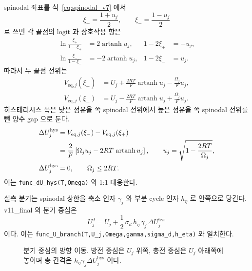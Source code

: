 \documentclass[11pt,a4paper]{article}
\newcommand{\eq}{\mathrm{eq}}
\newcommand{\hys}{\mathrm{hys}}
\begin{document}
spinodal 좌표를 식~\eqref{eq:spinodal_v7} 에서
\begin{equation}
\xi_+=\frac{1+u_j}{2},\qquad
\xi_-=\frac{1-u_j}{2}
\label{eq:spinodalpm}
\end{equation}
로 쓰면 각 끝점의 logit 과 상호작용 항은
\begin{align}
\ln\frac{\xi_+}{1-\xi_+}&=2\operatorname{artanh}u_j,
&
1-2\xi_+&=-u_j,\label{eq:spinodalplus}\\
\ln\frac{\xi_-}{1-\xi_-}&=-2\operatorname{artanh}u_j,
&
1-2\xi_-&=u_j.\label{eq:spinodalminus}
\end{align}
따라서 두 끝점 전위는
\begin{align}
V_{\eq,j}(\xi_+)
&=U_j+\frac{2RT}{F}\operatorname{artanh}u_j-\frac{\Omega_j}{F}u_j,\label{eq:Vspinplus}\\
V_{\eq,j}(\xi_-)
&=U_j-\frac{2RT}{F}\operatorname{artanh}u_j+\frac{\Omega_j}{F}u_j.\label{eq:Vspinminus}
\end{align}
히스테리시스 폭은 낮은 점유율 쪽 spinodal 전위에서 높은 점유율 쪽 spinodal 전위를 뺀 양수 gap 으로 둔다.
\begin{align}
\Delta U_j^\hys
&=V_{\eq,j}(\xi_-)-V_{\eq,j}(\xi_+)\notag\\
&=\frac{2}{F}\left[\Omega_j u_j-2RT\,\operatorname{artanh}u_j\right],
\qquad u_j=\sqrt{1-\frac{2RT}{\Omega_j}},\label{eq:dUhysraw}\\
\Delta U_j^\hys&=0,\qquad \Omega_j\le2RT.
\label{eq:dUhyszero}
\end{align}
이는 \texttt{func\_dU\_hys(T,Omega)} 와 1:1 대응한다.

실측 분기는 spinodal 상한을 축소 인자 $\gamma_j$ 와 부분 cycle 인자 $h_\eta$ 로 안쪽으로 당긴다. v11\_final 의 분기 중심은
\begin{equation}
\boxed{\;U_j^d=U_j+\frac12\,\sigma_d\,h_\eta\,\gamma_j\,\Delta U_j^\hys\;}
\label{eq:Ubranch}
\end{equation}
이다. 이는 \texttt{func\_U\_branch(T,U\_j,Omega,gamma,sigma\_d,h\_eta)} 와 일치한다.

\begin{figure}[t]
\centering
{}
\caption{분기 중심의 방향 이동. 방전 중심은 $U_j$ 위쪽, 충전 중심은 $U_j$ 아래쪽에 놓이며 총 간격은 $h_\eta\gamma_j\Delta U_j^\hys$ 이다.}
\label{fig:hysbranch}
\end{figure}
\end{document}
